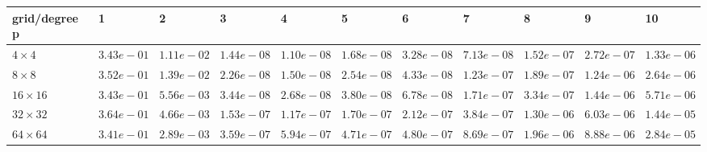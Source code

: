 \begin{tabular}{lllllllllll}
\hline
 grid/degree p   & 1          & 2          & 3          & 4          & 5          & 6          & 7          & 8          & 9          & 10         \\
\hline
 $4 \times 4$    & $3.43e-01$ & $1.11e-02$ & $1.44e-08$ & $1.10e-08$ & $1.68e-08$ & $3.28e-08$ & $7.13e-08$ & $1.52e-07$ & $2.72e-07$ & $1.33e-06$ \\
 $8 \times 8$    & $3.52e-01$ & $1.39e-02$ & $2.26e-08$ & $1.50e-08$ & $2.54e-08$ & $4.33e-08$ & $1.23e-07$ & $1.89e-07$ & $1.24e-06$ & $2.64e-06$ \\
 $16 \times 16$  & $3.43e-01$ & $5.56e-03$ & $3.44e-08$ & $2.68e-08$ & $3.80e-08$ & $6.78e-08$ & $1.71e-07$ & $3.34e-07$ & $1.44e-06$ & $5.71e-06$ \\
 $32 \times 32$  & $3.64e-01$ & $4.66e-03$ & $1.53e-07$ & $1.17e-07$ & $1.70e-07$ & $2.12e-07$ & $3.84e-07$ & $1.30e-06$ & $6.03e-06$ & $1.44e-05$ \\
 $64 \times 64$  & $3.41e-01$ & $2.89e-03$ & $3.59e-07$ & $5.94e-07$ & $4.71e-07$ & $4.80e-07$ & $8.69e-07$ & $1.96e-06$ & $8.88e-06$ & $2.84e-05$ \\
\hline
\end{tabular}